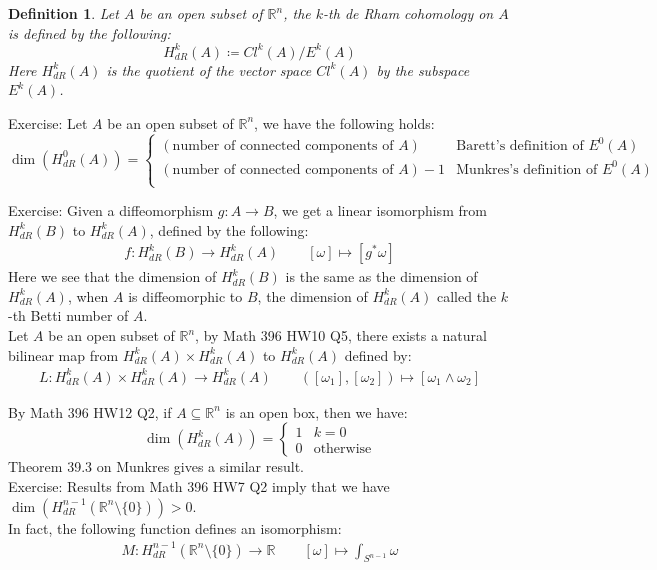 \documentclass[11pt,oneside]{book}
\theoremstyle{break}
\theoremstyle{break}
\newtheorem{defn}{Definition}[corL]
\newcommand{\R}{\mathbb{R}}
\newcommand{\exercise}{\color{green}Exercise: \color{black}}
\begin{document}
\begin{defn}
Let $A$ be an open subset of $\R^n$, the $k$-th de Rham cohomology on $A$ is defined by the following:
$$H^k_{dR}(A)\coloneqq Cl^k(A)/ E^k(A)$$
Here $H^k_{dR}(A)$ is the quotient of the vector space $Cl^k(A)$ by the subspace $ E^k(A)$. 
\end{defn}

\exercise Let $A$ be an open subset of $\R^n$, we have the following holds:
$$\dim(H^0_{dR}(A)) = \begin{cases}
(\text{number of connected components of }A) & \text{Barett's definition of }E^0(A) \\
(\text{number of connected components of }A)-1 & \text{Munkres's definition of }E^0(A) \\
\end{cases}$$

\exercise Given a diffeomorphism $g:A \to B$, we get a linear isomorphism from $H_{dR}^k(B)$ to $H_{dR}^k(A)$, defined by the following:
\begin{align*}
f:H_{dR}^k(B)\to H_{dR}^k(A)\qquad [\omega]\mapsto [g^*\omega]
\end{align*}
Here we see that the dimension of $H_{dR}^k(B)$ is the same as the dimension of $H_{dR}^k(A)$, when $A$ is diffeomorphic to $B$, the dimension of $H_{dR}^k(A)$ called the $k$-th Betti number of $A$.\\

Let $A$ be an open subset of $\R^n$, by Math 396 HW10 Q5, there exists a natural bilinear map from $H_{dR}^k(A)\times H_{dR}^k(A) $ to $H_{dR}^k(A)$ defined by:
\begin{align*}
L:H_{dR}^k(A)\times H_{dR}^k(A)\to H_{dR}^k(A)\qquad ([\omega_1], [\omega_2]) \mapsto [\omega_1 \wedge \omega_2]
\end{align*}



By Math 396 HW12 Q2, if $A \subseteq \R^n$ is an open box, then we have: 
$$\dim(H^k_{dR}(A)) = \begin{cases} 1 & k=0 \\ 0 &\text{otherwise}  \end{cases}$$ 
Theorem 39.3 on Munkres gives a similar result.\\

\exercise
Results from Math 396 HW7 Q2 imply that we have $\dim(H^{n-1}_{dR}(\R^n \setminus \{0\})) >0$. \\In fact, the following function defines an isomorphism:
\begin{align*}
M: H^{n-1}_{dR} (\R^n \setminus \{0\}) \to \R \qquad [\omega ]\mapsto \int_{S^{n-1}}\omega
\end{align*}
\end{document}
